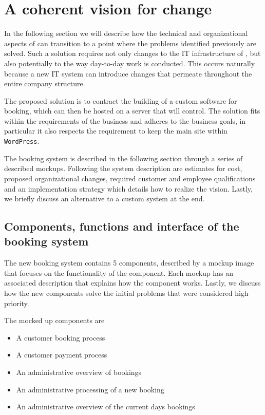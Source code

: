 \newpage
\section{A coherent vision for change}
In the following section we will describe how the technical and
organizational aspects of \gomonkey{} can transition to a point where the
problems identified previously are solved. Such a solution requires not only
changes to the IT infrastructure of \gomonkey{}, but also potentially to the way
day-to-day work is conducted. This occurs naturally because a new IT system
can introduce changes that permeate throughout the entire company structure.

The proposed solution is to contract the building of a custom software for
booking, which can then be hosted on a server that \gomonkey{} will
control. The solution fits within the requirements of the business and adheres
to the business goals, in particular it also respects the requirement to keep
the main site within \texttt{WordPress}.

The booking system is described in the following section through a series of
described mockups. Following the system description are estimates for cost,
proposed organizational changes, required customer and employee qualifications
and an implementation strategy which details how to realize the vision. Lastly,
we briefly discuss an alternative to a custom system at the end.

\subsection{Components, functions and interface of the booking system}
The new booking system contains 5 components, described by a mockup image that
focuses on the functionality of the component. Each mockup has an associated
description that explains how the component works. Lastly, we discuss how the
new components solve the initial problems that were considered high priority.

The mocked up components are
\begin{itemize}
    \item A customer booking process
    \item A customer payment process
    \item An administrative overview of bookings
    \item An administrative processing of a new booking
    \item An administrative overview of the current days bookings
\end{itemize}

